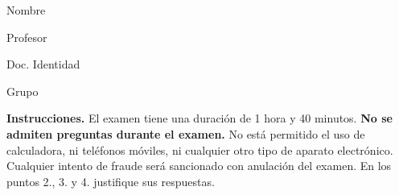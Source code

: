 \documentclass[11pt]{article}
\begin{document}
\examheader

\vspace{4pt}
\noindent
\begin{minipage}[t]{0.62\linewidth}
Nombre \dotfill

\vspace{4pt}
Profesor \dotfill
\end{minipage}%
\hfill
\begin{minipage}[t]{0.32\linewidth}
Doc. Identidad \dotfill

\vspace{4pt}
Grupo \dotfill
\end{minipage}

\vspace{6pt}
\noindent\textbf{Instrucciones.} El examen tiene una duración de 1 hora y 40 minutos. \textbf{No se admiten preguntas durante el examen.} No está permitido el uso de calculadora, ni teléfonos móviles, ni cualquier otro tipo de aparato electrónico. Cualquier intento de fraude será sancionado con anulación del examen. En los puntos 2., 3. y 4. justifique sus respuestas.
\end{document}
